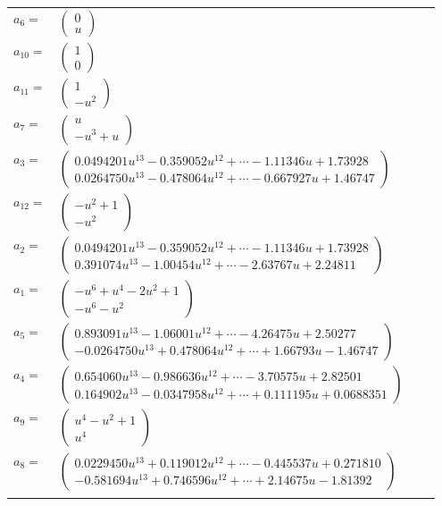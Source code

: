 \documentclass[1p]{elsarticle_modified}
\theoremstyle{definition}
\begin{document}
\begin{tabular}{m{7pt} m{180pt} m{7pt} m{180pt} }
\flushright $a_{6}=$&$\begin{pmatrix}0\\u\end{pmatrix}$ \\
\flushright $a_{10}=$&$\begin{pmatrix}1\\0\end{pmatrix}$ \\
\flushright $a_{11}=$&$\begin{pmatrix}1\\- u^2\end{pmatrix}$ \\
\flushright $a_{7}=$&$\begin{pmatrix}u\\- u^3+u\end{pmatrix}$ \\
\flushright $a_{3}=$&$\begin{pmatrix}0.0494201 u^{13}-0.359052 u^{12}+\cdots-1.11346 u+1.73928\\0.0264750 u^{13}-0.478064 u^{12}+\cdots-0.667927 u+1.46747\end{pmatrix}$ \\
\flushright $a_{12}=$&$\begin{pmatrix}- u^2+1\\- u^2\end{pmatrix}$ \\
\flushright $a_{2}=$&$\begin{pmatrix}0.0494201 u^{13}-0.359052 u^{12}+\cdots-1.11346 u+1.73928\\0.391074 u^{13}-1.00454 u^{12}+\cdots-2.63767 u+2.24811\end{pmatrix}$ \\
\flushright $a_{1}=$&$\begin{pmatrix}- u^6+u^4-2 u^2+1\\- u^6- u^2\end{pmatrix}$ \\
\flushright $a_{5}=$&$\begin{pmatrix}0.893091 u^{13}-1.06001 u^{12}+\cdots-4.26475 u+2.50277\\-0.0264750 u^{13}+0.478064 u^{12}+\cdots+1.66793 u-1.46747\end{pmatrix}$ \\
\flushright $a_{4}=$&$\begin{pmatrix}0.654060 u^{13}-0.986636 u^{12}+\cdots-3.70575 u+2.82501\\0.164902 u^{13}-0.0347958 u^{12}+\cdots+0.111195 u+0.0688351\end{pmatrix}$ \\
\flushright $a_{9}=$&$\begin{pmatrix}u^4- u^2+1\\u^4\end{pmatrix}$ \\
\flushright $a_{8}=$&$\begin{pmatrix}0.0229450 u^{13}+0.119012 u^{12}+\cdots-0.445537 u+0.271810\\-0.581694 u^{13}+0.746596 u^{12}+\cdots+2.14675 u-1.81392\end{pmatrix}$\\&\end{tabular}
\end{document}
